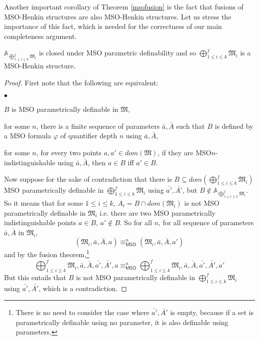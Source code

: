 \documentclass{LMCS}
\newcommand{\frM}{\mathfrak{M}}
\newcommand{\mso}{\textsf{MSO}\xspace}
\begin{document}
Another important corollary of Theorem \ref{msofusion} is the fact that fusions of \mso-Henkin structures are also \mso-Henkin structures.
Let us stress the importance of this fact, which is needed for the correctness of our main completeness argument.

\begin{cor}
$\mathbb{A}_{\bigoplus_{1\leq i\leq k}^f\frM_i}$ is closed
under \mso parametric definability and so $\bigoplus_{1\leq i\leq k}^f\frM_i$ is a \mso-Henkin
structure.\label{msohenkinfusion}
\end{cor}

\begin{proof}
First note that the following are equivalent:
\begin{iteMize}{$\bullet$}
\item   $B$ is \mso parametrically definable in $\frM$,
\item   for some $n$, there is a finite sequence of parameters $\bar{a},\bar{A}$ such that
$B$ is defined by a \mso formula $\varphi$ of quantifier depth $n$
using $\bar{a},\bar{A}$,
\item  for some $n$, for every two points $a,a'\in
dom(\frM)$, if they are \mso $n$-indistinguishable using
$\bar{a},\bar{A}$, then $a \in B$ iff $a' \in B$.
\end{iteMize}
Now suppose for the sake of contradiction that there is $B \subseteq dom(\bigoplus_{1\leq
i\leq k}^f\frM_i)$ \mso parametrically definable in
$\bigoplus_{1\leq i\leq k}^f\frM_i$ using $\bar{a'},\bar{A'}$, but $B
\notin \mathbb{A}_{\bigoplus_{1\leq i\leq k}^f\frM_i}$. So
it means that for some $1\leq i\leq k $, $A_i=B \cap dom(\frM_i)$
is not \mso parametrically definable in $\frM_i$ i.e. there are
two \mso parametrically indistinguishable points $a \in B$, $a'
\notin B$. So for all $n$, for all sequence of parameters
$\bar{a},\bar{A}$ in $\frM_i$, $$(\frM_i,\bar{a},\bar{A},
a)\equiv_\mso^n(\frM_i,\bar{a},\bar{A}, a')$$ and by the fusion theorem,\footnote{There is no need to consider the case where
$\bar{a'},\bar{A'}$ is empty, because if a set is parametrically
definable using no parameter, it is also definable using
parameters.} $$\bigoplus_{1\leq i\leq k}^f\frM_i,
\bar{a},\bar{A},\bar{a'},\bar{A'},a\equiv^n_\mso \bigoplus_{1\leq i\leq k}^f\frM_i,
\bar{a},\bar{A},\bar{a'},\bar{A'},a'$$ But this entails that $B$
is not \mso parametrically definable in
$\bigoplus_{1\leq i\leq k}^f\frM_i$ using $\bar{a'},\bar{A'}$, which is a contradiction.
\end{proof}
\end{document}
